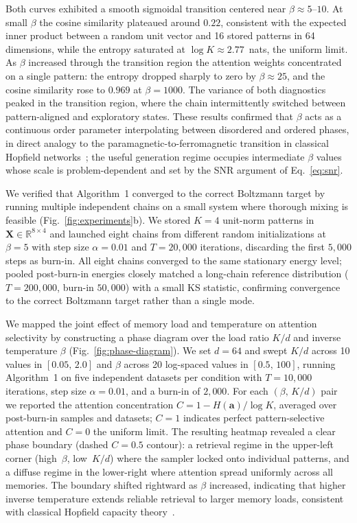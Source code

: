 Both curves exhibited a smooth sigmoidal transition centered near $\beta\approx 5\text{--}10$.
At small $\beta$ the cosine similarity plateaued around $0.22$, consistent with the expected inner product between a random unit vector and 16 stored patterns in 64 dimensions, while the entropy saturated at $\log K\approx 2.77$~nats, the uniform limit.
As $\beta$ increased through the transition region the attention weights concentrated on a single pattern: the entropy dropped sharply to zero by $\beta\approx 25$, and the cosine similarity rose to $0.969$ at $\beta=1000$.
The variance of both diagnostics peaked in the transition region, where the chain intermittently switched between pattern-aligned and exploratory states.
These results confirmed that $\beta$ acts as a continuous order parameter interpolating between disordered and ordered phases, in direct analogy to the paramagnetic-to-ferromagnetic transition in classical Hopfield networks~\cite{ackeleyLearningAlgorithmBoltzmann1985}; the useful generation regime occupies intermediate $\beta$ values whose scale is problem-dependent and set by the SNR argument of Eq.~\eqref{eq:snr}.

We verified that Algorithm~1 converged to the correct Boltzmann target by running multiple independent chains on a small system where thorough mixing is feasible (Fig.~\ref{fig:experiments}b).
We stored $K=4$ unit-norm patterns in $\mathbf{X}\in\mathbb{R}^{8\times 4}$ and launched eight chains from different random initializations at $\beta=5$ with step size $\alpha=0.01$ and $T=20{,}000$ iterations, discarding the first $5{,}000$ steps as burn-in.
All eight chains converged to the same stationary energy level; pooled post-burn-in energies closely matched a long-chain reference distribution ($T=200{,}000$, burn-in $50{,}000$) with a small KS statistic, confirming convergence to the correct Boltzmann target rather than a single mode.

We mapped the joint effect of memory load and temperature on attention selectivity by constructing a phase diagram over the load ratio $K/d$ and inverse temperature $\beta$ (Fig.~\ref{fig:phase-diagram}).
We set $d=64$ and swept $K/d$ across 10 values in $[0.05,\,2.0]$ and $\beta$ across 20 log-spaced values in $[0.5,\,100]$, running Algorithm~1 on five independent datasets per condition with $T=10{,}000$ iterations, step size $\alpha=0.01$, and a burn-in of $2{,}000$.
For each $(\beta,\,K/d)$ pair we reported the attention concentration $C = 1 - H(\mathbf{a})/\log K$, averaged over post-burn-in samples and datasets; $C=1$ indicates perfect pattern-selective attention and $C=0$ the uniform limit.
The resulting heatmap revealed a clear phase boundary (dashed $C=0.5$ contour): a retrieval regime in the upper-left corner (high~$\beta$, low~$K/d$) where the sampler locked onto individual patterns, and a diffuse regime in the lower-right where attention spread uniformly across all memories.
The boundary shifted rightward as $\beta$ increased, indicating that higher inverse temperature extends reliable retrieval to larger memory loads, consistent with classical Hopfield capacity theory~\cite{amitStoringInfiniteNumbers1985}.


